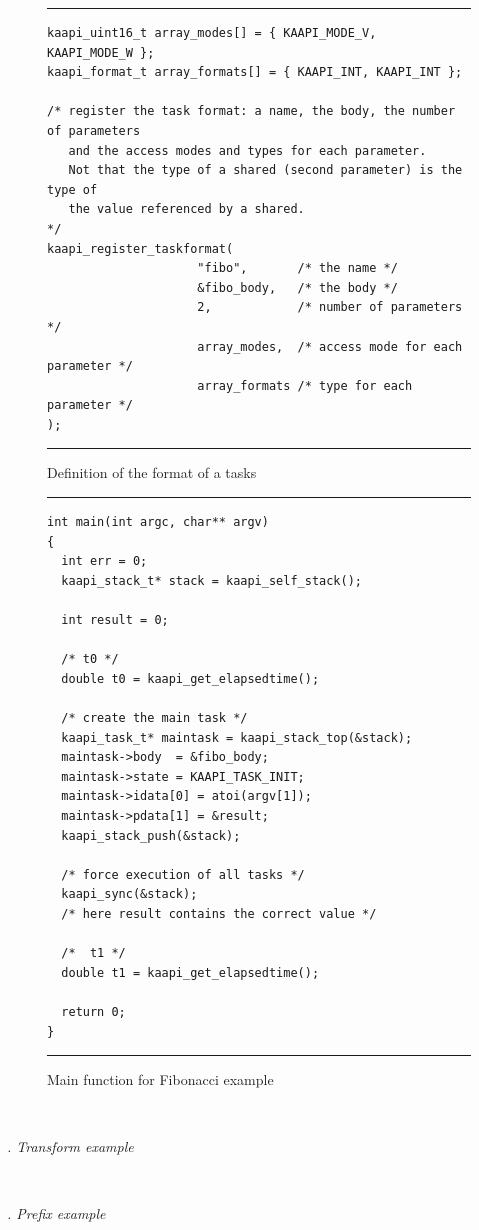 \documentclass{report}
\renewcommand{\subsubsection}[1]{~\\ \addtocounter{subsubsection}{1} \noindent\textit{
\thesubsubsection. #1\\}}
\begin{document}
\begin{figure}
\hrule
\begin{verbatim}
kaapi_uint16_t array_modes[] = { KAAPI_MODE_V, KAAPI_MODE_W };
kaapi_format_t array_formats[] = { KAAPI_INT, KAAPI_INT };

/* register the task format: a name, the body, the number of parameters
   and the access modes and types for each parameter.
   Not that the type of a shared (second parameter) is the type of 
   the value referenced by a shared.
*/
kaapi_register_taskformat(
                     "fibo",       /* the name */
                     &fibo_body,   /* the body */
                     2,            /* number of parameters */
                     array_modes,  /* access mode for each parameter */
                     array_formats /* type for each parameter */
); 
\end{verbatim}
\hrule
\caption{Definition of the format of a tasks}
\label{fig:fiboformat}
\end{figure}

\begin{figure}[!h]
\hrule
\begin{verbatim}
int main(int argc, char** argv)
{
  int err = 0;
  kaapi_stack_t* stack = kaapi_self_stack();

  int result = 0;
  
  /* t0 */
  double t0 = kaapi_get_elapsedtime();
  
  /* create the main task */
  kaapi_task_t* maintask = kaapi_stack_top(&stack);
  maintask->body  = &fibo_body;
  maintask->state = KAAPI_TASK_INIT;
  maintask->idata[0] = atoi(argv[1]);
  maintask->pdata[1] = &result;
  kaapi_stack_push(&stack);
  
  /* force execution of all tasks */
  kaapi_sync(&stack);
  /* here result contains the correct value */

  /*  t1 */
  double t1 = kaapi_get_elapsedtime();

  return 0;
}
\end{verbatim}
\hrule
\caption{Main function for Fibonacci example}
\label{fig:fibomain}
\end{figure}


\subsubsection{Transform example}

\subsubsection{Prefix example}
\end{document}
